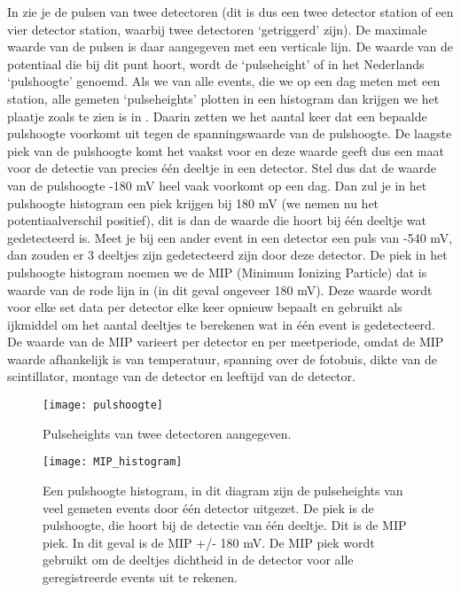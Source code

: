 In  zie je de pulsen van twee detectoren (dit is
dus een twee detector station of een vier detector station, waarbij twee 
detectoren `getriggerd' zijn). De maximale waarde van de pulsen is daar
aangegeven met een verticale lijn. De waarde van de potentiaal die bij
dit punt hoort, wordt de `pulseheight' of in het Nederlands `pulshoogte'
genoemd. Als we van alle events, die we op een dag meten met een
station, alle gemeten `pulseheights' plotten in een histogram dan
krijgen we het plaatje zoals te zien is in . Daarin
zetten we het aantal keer dat een bepaalde pulshoogte voorkomt uit tegen
de spanningswaarde van de pulshoogte. De laagste piek van de pulshoogte
komt het vaakst voor en deze waarde geeft dus een maat voor de detectie van
precies één deeltje in een detector. Stel dus dat de waarde van de
pulshoogte -180 mV heel vaak voorkomt op een dag. Dan zul je in het
pulshoogte histogram een piek krijgen bij 180 mV (we nemen nu het
potentiaalverschil positief), dit is dan de waarde die hoort bij één
deeltje wat gedetecteerd is. Meet je bij een ander event in een detector
een puls van -540 mV, dan zouden er 3 deeltjes zijn gedetecteerd
zijn door deze detector. De piek in het pulshoogte histogram noemen we
de MIP (Minimum Ionizing Particle) dat is waarde van de rode lijn in
 (in dit geval ongeveer 180 mV). Deze waarde wordt voor elke set
data per detector elke keer opnieuw bepaalt en gebruikt als ijkmiddel om
het aantal deeltjes te berekenen wat in één event is gedetecteerd. De waarde
van de MIP varieert per detector en per meetperiode, omdat de MIP waarde
afhankelijk is van temperatuur, spanning over de fotobuis, dikte van de
scintillator, montage van de detector en leeftijd van de detector. 

\begin{figure}
    \centering
    \texttt{[image: pulshoogte]}
    \caption{Pulseheights van twee detectoren aangegeven.}
    \label{fig:pulshoogte}
\end{figure} 

\begin{figure}
    \centering
    \texttt{[image: MIP\_histogram]}
    \caption{Een pulshoogte histogram, in dit diagram zijn de pulseheights van veel 
    gemeten events door één detector uitgezet. De piek is de pulshoogte,
    die hoort bij de detectie van één deeltje. Dit is de MIP piek. In dit geval is
    de MIP +/- 180 mV. De MIP piek wordt gebruikt om de deeltjes
    dichtheid in de detector voor alle geregistreerde events uit te
    rekenen.}
    \label{fig:MIP_histogram}
\end{figure} 

